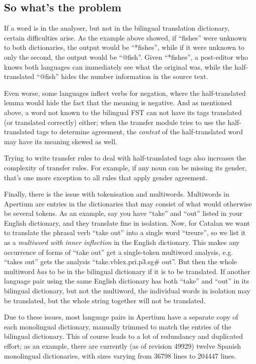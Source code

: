 \documentclass[11pt]{article}
\begin{document}
\subsection{So what's the problem}

If a word is in the analyser, but not in the bilingual translation
dictionary, certain difficulties arise. As the example above showed,
if ``fishes'' were unknown to both dictionaries, the output would be
``*fishes'', while if it were unknown to only the second, the output
would be ``@fish''. Given ``*fishes'', a post-editor who knows both
languages can immediately see what the original was, while the
half-translated ``@fish'' hides the number information in the source
text. 

Even worse, some languages inflect verbs for negation, where the
half-translated lemma would hide the fact that the meaning is
negative. And as mentioned above, a word not known to the bilingual
FST can not have its tags translated (or translated correctly) either;
when the transfer module tries to use the half-translated tags to
determine agreement, the \emph{context} of the half-translated word
may have its meaning skewed as well.

Trying to write transfer rules to deal with half-translated tags also
increases the complexity of transfer rules. For example, if any noun
can be missing its gender, that's one more exception to all rules that
apply gender agreement.

Finally, there is the issue with tokenisation and multiwords.
Multiwords in Apertium are entries in the dictionaries that may
consist of what would otherwise be several tokens. As an example, say
you have ``take'' and ``out'' listed in your English dictionary, and
they translate fine in isolation. Now, for Catalan we want to
translate the phrasal verb ``take out'' into a single word ``treure'',
so we list it as a \emph{multiword with inner inflection} in the
English dictionary. This makes any occurrence of forms of ``take out''
get a single-token multiword analysis, e.g. ``takes out'' gets the
analysis ``take.vblex.pri.p3.sg# out''. But then the whole multiword
\emph{has} to be in the bilingual dictionary if it is to be
translated. If another language pair using the same English dictionary
has both ``take'' and ``out'' in its bilingual dictionary, but not the
multiword, the individual words in isolation may be translated, but
the whole string together will not be translated.

Due to these issues, most language pairs in Apertium have a separate
copy of each monolingual dictionary, manually trimmed to match the
entries of the bilingual dictionary. This of course leads to a lot of
redundancy and duplicated effort; as an example, there are currently
(as of revision 49929) twelve Spanish monolingual dictionaries, with
sizes varying from 36798 lines to 204447 lines.
\end{document}
